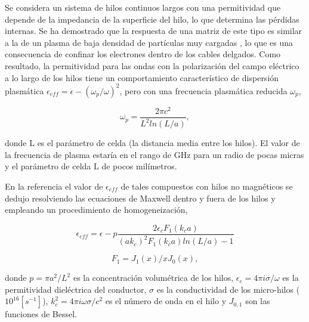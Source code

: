 \documentclass[12pt,letterpaper]{article}
\numberwithin{equation}{section}
\begin{document}
Se considera un sistema de hilos continuos largos con una permitividad que depende de la impedancia de la superficie del hilo, lo que determina las pérdidas internas. Se ha demostrado que la respuesta de una matriz de este tipo es similar a la de un plasma de baja densidad de partículas muy cargadas \cite{Wire_theory_2}, lo que es una consecuencia de confinar los electrones dentro de los cables delgados. Como resultado, la permitividad para las ondas con la polarización del campo eléctrico a lo largo de los hilos tiene un comportamiento característico de dispersión plasmática $\epsilon_{eff} = \epsilon-(\omega_p/\omega)^2$, pero con una frecuencia plasmática reducida $\omega_p$,

$$\omega_p=\frac{2\pi c^2}{L^2ln(L/a)},$$

donde L es el parámetro de celda (la distancia media entre los hilos). El valor de la frecuencia de plasma estaría en el rango de GHz para un radio de pocas micras y el parámetro de celda L de pocos milímetros.

En la referencia \cite{Wire_theory_2} el valor de $\epsilon_{eff}$ de tales compuestos con hilos no magnéticos se dedujo resolviendo las ecuaciones de Maxwell dentro y fuera de los hilos y empleando un procedimiento de homogeneización,

\begin{equation}
	\epsilon_{eff}=\epsilon - p\frac{2\epsilon_c F_1(k_ca)}{(ak_c)^2F_1(k_ca)ln(L/a)-1}
	\label{permitividad}
\end{equation}

$$F_1=J_1(x)/xJ_0(x),$$

donde $p = \pi a^2/L^2$ es la concentración volumétrica de los hilos, $\epsilon_c = 4\pi i \sigma/\omega$ es la permitividad dieléctrica del conductor, $\sigma$ es la conductividad de los micro-hilos (~$10^{16} [s^{-1}]$), $k_c^2 = 4\pi i \omega\sigma / c^2$ es el número de onda en el hilo y $J_{0,1}$ son las funciones de Bessel.
\end{document}
